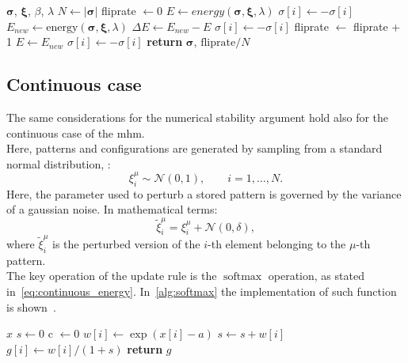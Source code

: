 \documentclass[\rootdir/main.tex]{subfiles}
\begin{document}
\begin{algorithm}
    \caption{Metropolis algorithm for the \acrlong{mhm}}
    \label{alg:mhm_metropolis}
    \begin{algorithmic}[1]
    \Require $\symbf{\sigma}$, $\symbf{\xi}$, $\beta$, $\lambda$
        \State $N \gets |\symbf{\sigma}|$ 
        \State fliprate $\gets 0$
        \State $E \gets energy\left(\symbf{\sigma}, \symbf{\xi}, \lambda\right)$
        \State $\sigma[i] \gets - \sigma[i]$
        \State $E_{new} \gets \text{energy}\left(\symbf{\sigma}, \symbf{\xi}, \lambda\right)$
        \State $\Delta E \gets E_{new} - E$
            \State $\sigma[i] \gets - \sigma[i]$
            \State fliprate $\gets$ fliprate + 1
            \State $E \gets E_{new}$
        \Else
            \State $\sigma[i] \gets - \sigma[i]$
        \EndIf
        \EndFor
    \State \textbf{return} $\symbf{\sigma}$, $\text{fliprate} / N$
    \end{algorithmic}
\end{algorithm}

\subsection{Continuous case}\label{sec:numsim_continuous}
The same considerations for the numerical stability argument hold also for the continuous case of the \acrlong{mhm}.\\
Here, patterns and configurations are generated by sampling from a standard normal distribution, \ie:
\begin{equation*}
    \xi_i^{\mu} \sim \mathcal{N}\left(0, 1\right), \qquad i = 1, \dots, N.
\end{equation*}
Here, the parameter used to perturb a stored pattern is governed by the variance of a gaussian noise. In mathematical terms:
\begin{equation*}
    \tilde{\xi}_i^{\mu} = \xi_i^{\mu} + \mathcal{N}\left(0, \delta\right),
\end{equation*}
where $\tilde{\xi}_i^{\mu}$ is the perturbed version of the $i$-th element belonging to the $\mu$-th pattern.\\
The key operation of the update rule is the $\operatorname{softmax}$ operation, as stated in~\cref{eq:continuous_energy}. In~\cref{alg:softmax} the implementation of such function is shown~\cite{numerically_stable}.

\begin{algorithm}
    \caption{Softmax algorithm}
    \label{alg:softmax}
    \begin{algorithmic}[1]
    \Require $x$
    \State $s \gets 0$
    \State c $\gets 0$
        \State $w[i] \gets \exp\left(x[i] - a\right)$
            \State $s \gets s + w[i]$
        \EndIf
    \EndFor
        \State $g[i] \gets w[i]/(1+s)$
    \EndFor
    \State \textbf{return} $g$
\end{algorithmic}
\end{algorithm}
\end{document}
